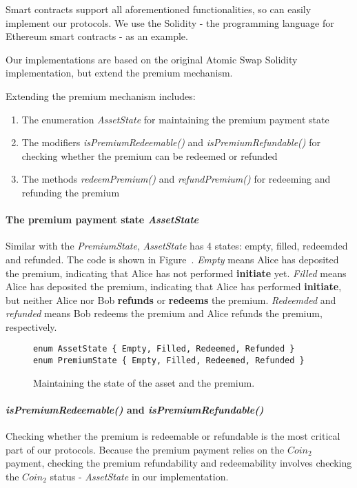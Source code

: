 Smart contracts support all aforementioned functionalities, so can easily implement our protocols.
We use the Solidity - the programming language for Ethereum smart contracts - as an example.

Our implementations are based on the original Atomic Swap Solidity implementation,
but extend the premium mechanism.

Extending the premium mechanism includes:

\begin{enumerate}
    \item The enumeration \textit{AssetState} for maintaining the premium payment state
    \item The modifiers \textit{isPremiumRedeemable()} and \textit{isPremiumRefundable()} for checking whether the premium can be redeemed or refunded
    \item The methods \textit{redeemPremium()} and \textit{refundPremium()} for redeeming and refunding the premium
\end{enumerate}

\paragraph{The premium payment state \textit{AssetState}}

Similar with the \textit{PremiumState}, \textit{AssetState} has 4 states: empty, filled, redeemded and refunded.
The code is shown in Figure~\cite{code:state}.
\textit{Empty} means Alice has deposited the premium, indicating that Alice has not performed \textbf{initiate} yet.
\textit{Filled} means Alice has deposited the premium, indicating that Alice has performed \textbf{initiate}, but neither Alice nor Bob \textbf{refunds} or \textbf{redeems} the premium.
\textit{Redeemded} and \textit{refunded} means Bob redeems the premium and Alice refunds the premium, respectively.

\begin{figure}
\begin{lstlisting}[language=Solidity, basicstyle=\tiny]
enum AssetState { Empty, Filled, Redeemed, Refunded }
enum PremiumState { Empty, Filled, Redeemed, Refunded }
\end{lstlisting}
\label{code:state}
\caption{Maintaining the state of the asset and the premium.}
\end{figure}

\paragraph{\textit{isPremiumRedeemable()} and \textit{isPremiumRefundable()}}
Checking whether the premium is redeemable or refundable is the most critical part of our protocols.
Because the premium payment relies on the $Coin_2$ payment, checking the premium refundability and redeemability involves checking the $Coin_2$ status - \textit{AssetState} in our implementation.

